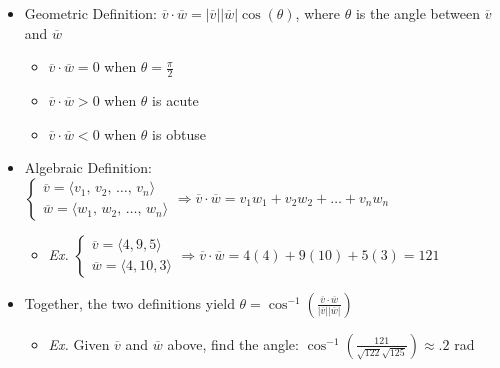 \begin{itemize}
\begin{itemize}
      \item Geometric Definition: $\overline{v} \cdot \overline{w} = |\overline{v}||\overline{w}|\cos(\theta)$, where $\theta$ is the angle between $\overline{v}$ and $\overline{w}$

        \begin{itemize}

          \item $\overline{v}\cdot\overline{w} = 0$ when $\theta = \frac{\pi}{2}$

          \item $\overline{v}\cdot\overline{w} > 0$ when $\theta$ is acute

          \item $\overline{v}\cdot\overline{w} < 0$ when $\theta$ is obtuse

        \end{itemize}

      \item Algebraic Definition: $\left\{\begin{array}{c} \overline{v} = \langle v_1,\,v_2,\,\dots,\,v_n \rangle \\ \overline{w} = \langle w_1,\,w_2,\,\dots,\,w_n \rangle \end{array} \Rightarrow \overline{v}\cdot\overline{w} = v_1w_1 + v_2w_2 + \dots + v_nw_n$

          \begin{itemize}

            \item \textit{Ex.} $\left\{\begin{array}{c} \overline{v} = \langle 4, 9, 5 \rangle \\ \overline{w} = \langle 4, 10, 3 \rangle \end{array} \Rightarrow \overline{v}\cdot\overline{w} = 4(4) + 9(10) + 5(3) = 121$

          \end{itemize}

        \item Together, the two definitions yield $\theta = \cos^{-1}\left(\frac{\overline{v}\cdot\overline{w}}{|\overline{v}||\overline{w}|}\right)$

          \begin{itemize}

            \item \textit{Ex.} Given $\overline{v}$ and $\overline{w}$ above, find the angle: $\cos^{-1}\left( \frac{121}{\sqrt{122}\sqrt{125}} \right)\approx .2$ rad


\end{itemize}
\end{itemize}
\end{itemize}
